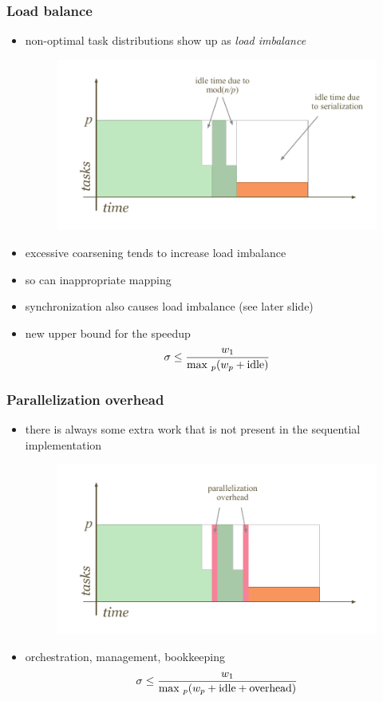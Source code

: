 \begin{frame}[fragile]
%
  \frametitle{Load balance}
%
  \begin{itemize}
%
  \item non-optimal task distributions show up as {\em load imbalance}
    \begin{figure}
      \centering
      \includegraphics[scale=1.0]{figures/reduction-load-imbalance.pdf}
    \end{figure}
%
  \item excessive coarsening tends to increase load imbalance
  \item so can inappropriate mapping
  \item synchronization also causes load imbalance (see later slide)
  \item new upper bound for the speedup
    \[
    \sigma \leq \frac{w_{1}}{{\rm max\ }_{p}(w_{p} + {\rm idle})}
    \]
      
  \end{itemize}
%
\end{frame}

\begin{frame}[fragile]
%
  \frametitle{Parallelization overhead}
%
  \begin{itemize}
%
  \item there is always some extra work that is not present in the sequential implementation
    \begin{figure}
      \centering
      \includegraphics[scale=1.0]{figures/reduction-overhead.pdf}
    \end{figure}
%
  \item orchestration, management, bookkeeping
    \[
    \sigma \leq \frac{w_{1}}{{\rm max\ }_{p}(w_{p} + {\rm idle} + {\rm overhead})}
    \]
      
%
  \end{itemize}
%
\end{frame}

